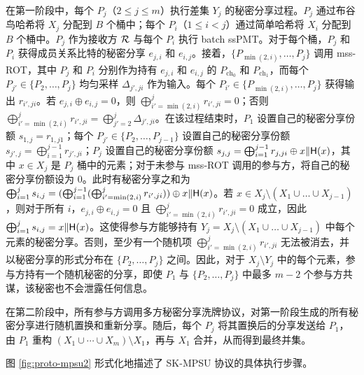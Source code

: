 在第一阶段中，每个 $P_j$（$2 \le j \le m$）执行差集 $Y_j$ 的秘密分享过程。$P_j$ 通过布谷鸟哈希将 $X_j$ 分配到 $B$ 个桶中；每个 $P_i$（$1 \le i < j$）通过简单哈希将 $X_i$ 分配到 $B$ 个桶中。$P_j$ 作为接收方 $\mathcal{R}$ 与每个 $P_i$ 执行 batch ssPMT。对于每个桶，$P_j$ 和 $P_i$ 获得成员关系比特的秘密分享 $e_{j,i}$ 和 $e_{i,j}$。接着，$\{P_{\min(2,i)}, \dots, P_j\}$ 调用 mss-ROT，其中 $P_j$ 和 $P_i$ 分别作为持有 $e_{j,i}$ 和 $e_{i,j}$ 的 $P_{\text{ch}_0}$ 和 $P_{\text{ch}_1}$，而每个 $P_{j'} \in \{P_2, \dots, P_j\}$ 均匀采样 $\Delta_{j',ji}$ 作为输入。每个 $P_{i'} \in \{P_{\min(2,i)}, \dots, P_j\}$ 获得输出 $r_{i',ji}$。若 $e_{j,i} \oplus e_{i,j} = 0$，则 $\bigoplus_{i'=\min(2,i)}^j r_{i',ji} = 0$；否则 $\bigoplus_{i'=\min(2,i)}^j r_{i',ji} = \bigoplus_{j'=2}^j \Delta_{j',ji}$。在该过程结束时，$P_1$ 设置自己的秘密分享份额 $s_{1,j} = r_{1,j1}$；每个 $P_{j'} \in \{P_2, \dots, P_{j-1}\}$ 设置自己的秘密分享份额 $s_{j',j} = \bigoplus_{i=1}^{j-1} r_{j',ji}$；$P_j$ 设置自己的秘密分享份额 $s_{j,j} = \bigoplus_{i=1}^{j-1} r_{j,ji} \oplus x \Vert \mathsf{H}(x)$，其中 $x \in X_j$ 是 $P_j$ 桶中的元素；对于未参与 mss-ROT 调用的参与方，将自己的秘密分享份额设为 0。此时有秘密分享之和为 $\bigoplus_{i=1}^j s_{i,j} = (\bigoplus_{i=1}^{j-1} (\bigoplus_{i'=\min(2,i)}^j r_{i',ji})) \oplus x \Vert \mathsf{H}(x)$。若 $x \in X_j \setminus (X_1 \cup \dots \cup X_{j-1})$，则对于所有 $i$，$e_{j,i} \oplus e_{i,j} = 0$ 且 $\bigoplus_{i'=\min(2,i)}^j r_{i',ji} = 0$ 成立，因此 $\bigoplus_{i=1}^j s_{i,j} = x \Vert \mathsf{H}(x)$。这使得参与方能够持有 $Y_j = X_j \setminus (X_1 \cup \dots \cup X_{j-1})$ 中每个元素的秘密分享。否则，至少有一个随机项 $\bigoplus_{i'=\min(2,i)}^j r_{i',ji}$ 无法被消去，并以秘密分享的形式分布在 $\{P_2, \dots, P_j\}$ 之间。因此，对于 $X_j \setminus Y_j$ 中的每个元素，参与方持有一个随机秘密的分享，即使 $P_1$ 与 $\{P_2, \dots, P_j\}$ 中最多 $m-2$ 个参与方共谋，该秘密也不会泄露任何信息。

在第二阶段中，所有参与方调用多方秘密分享洗牌协议，对第一阶段生成的所有秘密分享进行随机置换和重新分享。随后，每个 $P_j$ 将其置换后的分享发送给 $P_1$，由 $P_1$ 重构 $(X_1 \cup \cdots \cup X_m)\setminus X_1$，再与 $X_1$ 合并，从而得到最终并集。

图 \ref{fig:proto-mpsu2} 形式化地描述了 SK-MPSU 协议的具体执行步骤。

